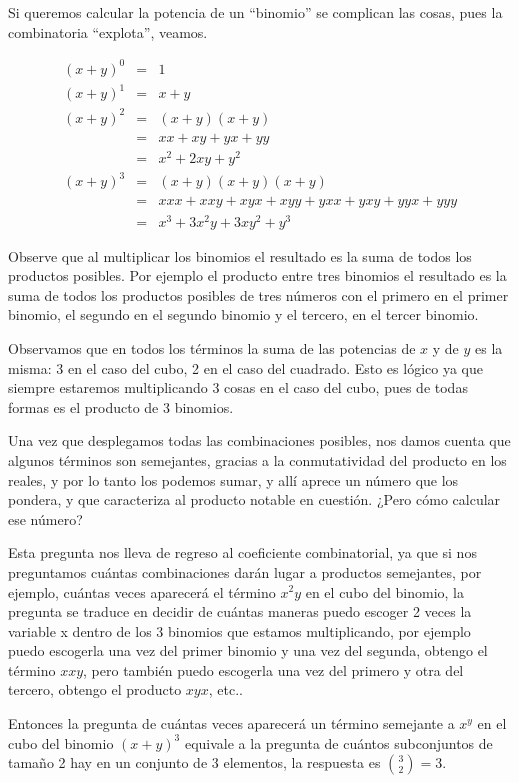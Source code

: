 Si queremos calcular la potencia de un ``binomio'' se complican las cosas, pues la combinatoria ``explota'', veamos.

\begin{eqnarray*}
  (x+y)^0 &=& 1\\
  (x+y)^1 &=& x+y\\
  (x+y)^2 &=& (x+y)(x+y)\\
  &=& xx + xy + yx + yy\\
  &=& x^2+2xy+y^2\\
  (x+y)^3 &=& (x+y)(x+y)(x+y)\\
  &=& xxx+xxy+xyx+xyy+yxx+yxy+yyx+yyy\\
  &=& x^3+3x^2y+3xy^2+y^3
\end{eqnarray*}

Observe que al multiplicar los binomios el resultado es la suma de todos los productos posibles.
Por ejemplo el producto entre tres binomios el resultado es la suma de todos los productos posibles de tres n\'umeros con el primero en el primer binomio, el
segundo en el segundo binomio y el tercero, en el tercer binomio.

Observamos que en todos los términos la suma de las potencias de $x$ y de $y$ es la misma: 3 en el caso del cubo, 2 en el caso del cuadrado.
Esto es lógico ya que siempre estaremos multiplicando 3 cosas en el caso del cubo, pues de todas formas es el producto de 3 binomios.

Una vez que desplegamos todas las combinaciones posibles, nos damos cuenta que algunos términos son semejantes, gracias a la conmutatividad del producto en los reales, y por lo tanto los podemos sumar, y allí aprece un número que los pondera, y que caracteriza al producto notable en cuestión. ¿Pero cómo calcular ese número?

Esta pregunta  nos lleva de regreso al coeficiente combinatorial, ya que si nos preguntamos cuántas combinaciones darán lugar a productos semejantes, por ejemplo, cuántas veces aparecerá el término $x^2y$ en el cubo del binomio, la pregunta se traduce en decidir de cuántas maneras puedo escoger 2 veces la variable x dentro de los 3 binomios que estamos multiplicando, por ejemplo puedo escogerla una vez del primer binomio y una vez del segunda, obtengo el término $xxy$, pero también puedo escogerla una vez del primero y otra del tercero, obtengo el producto $xyx$, etc..

Entonces la pregunta de cuántas veces aparecerá un término semejante a $x^y$ en el cubo del binomio $(x+y)^3$ equivale a la pregunta de cuántos subconjuntos de tamaño 2 hay en un conjunto de 3 elementos, la respuesta es ${3\choose2}=3$.

